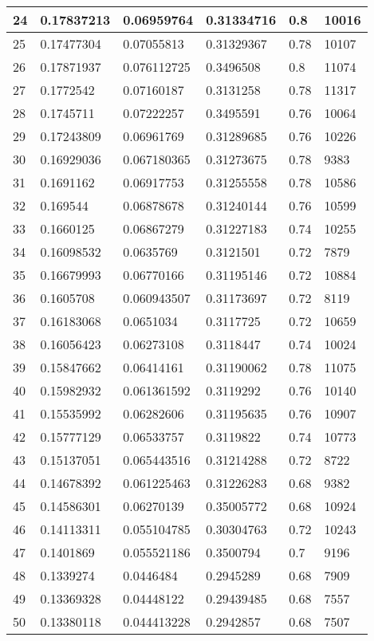 \begin{longtable}{|l|l|l|l|l|l|}
24 & 0.17837213 & 0.06959764 & 0.31334716 & 0.8 & 10016 \\ \hline 
25 & 0.17477304 & 0.07055813 & 0.31329367 & 0.78 & 10107 \\ \hline 
26 & 0.17871937 & 0.076112725 & 0.3496508 & 0.8 & 11074 \\ \hline 
27 & 0.1772542 & 0.07160187 & 0.3131258 & 0.78 & 11317 \\ \hline 
28 & 0.1745711 & 0.07222257 & 0.3495591 & 0.76 & 10064 \\ \hline 
29 & 0.17243809 & 0.06961769 & 0.31289685 & 0.76 & 10226 \\ \hline 
30 & 0.16929036 & 0.067180365 & 0.31273675 & 0.78 & 9383 \\ \hline 
31 & 0.1691162 & 0.06917753 & 0.31255558 & 0.78 & 10586 \\ \hline 
32 & 0.169544 & 0.06878678 & 0.31240144 & 0.76 & 10599 \\ \hline 
33 & 0.1660125 & 0.06867279 & 0.31227183 & 0.74 & 10255 \\ \hline 
34 & 0.16098532 & 0.0635769 & 0.3121501 & 0.72 & 7879 \\ \hline 
35 & 0.16679993 & 0.06770166 & 0.31195146 & 0.72 & 10884 \\ \hline 
36 & 0.1605708 & 0.060943507 & 0.31173697 & 0.72 & 8119 \\ \hline 
37 & 0.16183068 & 0.0651034 & 0.3117725 & 0.72 & 10659 \\ \hline 
38 & 0.16056423 & 0.06273108 & 0.3118447 & 0.74 & 10024 \\ \hline 
39 & 0.15847662 & 0.06414161 & 0.31190062 & 0.78 & 11075 \\ \hline 
40 & 0.15982932 & 0.061361592 & 0.3119292 & 0.76 & 10140 \\ \hline 
41 & 0.15535992 & 0.06282606 & 0.31195635 & 0.76 & 10907 \\ \hline 
42 & 0.15777129 & 0.06533757 & 0.3119822 & 0.74 & 10773 \\ \hline 
43 & 0.15137051 & 0.065443516 & 0.31214288 & 0.72 & 8722 \\ \hline 
44 & 0.14678392 & 0.061225463 & 0.31226283 & 0.68 & 9382 \\ \hline 
45 & 0.14586301 & 0.06270139 & 0.35005772 & 0.68 & 10924 \\ \hline 
46 & 0.14113311 & 0.055104785 & 0.30304763 & 0.72 & 10243 \\ \hline 
47 & 0.1401869 & 0.055521186 & 0.3500794 & 0.7 & 9196 \\ \hline 
48 & 0.1339274 & 0.0446484 & 0.2945289 & 0.68 & 7909 \\ \hline 
49 & 0.13369328 & 0.04448122 & 0.29439485 & 0.68 & 7557 \\ \hline 
50 & 0.13380118 & 0.044413228 & 0.2942857 & 0.68 & 7507 \\ \hline 
\end{longtable}